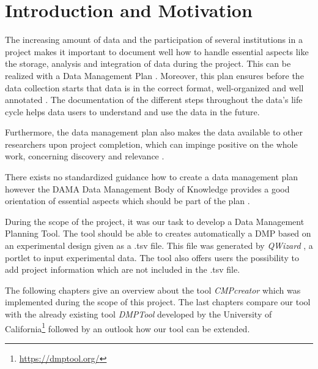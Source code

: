 
\section{Introduction and Motivation}
The increasing amount of data and the participation of several institutions in a project makes it important to document well how to handle essential aspects like the storage, analysis and integration of data during the project. This can be realized with a Data Management Plan \cite{lecture}. Moreover, this plan ensures before the data collection starts that data is in the correct format, well-organized and well annotated \cite{planWhy}. The documentation of the different steps throughout the data's life cycle helps data users to understand and use the data in the future. 

Furthermore, the data management plan also makes the data available to other researchers upon project completion, which can impinge positive on the whole work, concerning discovery and relevance \cite{planWhy}.


There exists no standardized guidance how to create a data management plan however the DAMA Data Management Body of Knowledge \cite{DAMAInternational:2009:DGD:1593444} provides a good orientation of essential aspects which should be part of the plan \cite{lecture}. 


During the scope of the project, it was our task to develop a Data Management Planning Tool. The tool should be able to creates automatically a DMP based on an experimental design given as a .tsv file. This file was generated by \textit{QWizard} \cite{qwizard}, a portlet to input experimental data. The tool also offers users the possibility to add project information which are not included in the .tsv file.


The following chapters give an overview about the tool \textit{CMPcreator} which was implemented during the scope of this project. The last chapters compare our tool with the  already existing tool \textit{DMPTool} developed by the University of California\footnote{\url{https://dmptool.org/}} followed by an outlook how our tool can be extended.

